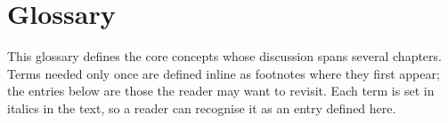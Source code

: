 \chapter*{Glossary}

This glossary defines the core concepts whose discussion spans several chapters. Terms needed only once are defined inline as footnotes where they first appear; the entries below are those the reader may want to revisit. Each term is set in italics in the text, so a reader can recognise it as an entry defined here.

\printnoidxglossaries
